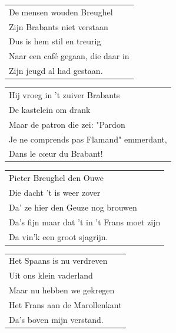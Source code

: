 \documentclass[a4paper, 14pt]{extarticle}
\begin{document}
\begin{flushleft}
\begin{tabularx}{0.8\textwidth} {
   >{\raggedright\arraybackslash}X}
\end{tabularx}
\end{flushleft}\begin{flushleft}
\begin{tabularx}{0.8\textwidth} {
   >{\raggedright\arraybackslash}X}
De mensen wouden Breughel\\
Zijn Brabants niet verstaan\\
Dus is hem stil en treurig\\
Naar een café gegaan, die daar in\\
Zijn jeugd al had gestaan.\\
\end{tabularx}
\end{flushleft}\begin{flushleft}
\begin{tabularx}{0.8\textwidth} {
   >{\raggedright\arraybackslash}X}
Hij vroeg in ’t zuiver Brabants\\
De kastelein om drank\\
Maar de patron die zei: "Pardon\\
Je ne comprends pas Flamand" emmerdant,\\
Dans le cœur du Brabant!\\
\end{tabularx}
\end{flushleft}\begin{flushleft}
\begin{tabularx}{0.8\textwidth} {
   >{\raggedright\arraybackslash}X}
Pieter Breughel den Ouwe\\
Die dacht ’t is weer zover\\
Da’ ze hier den Geuze nog brouwen\\
Da’s fijn maar dat ’t in ’t Frans moet zijn\\
Da vin’k een groot sjagrijn.\\
\end{tabularx}
\end{flushleft}\begin{flushleft}
\begin{tabularx}{0.8\textwidth} {
   >{\raggedright\arraybackslash}X}
Het Spaans is nu verdreven\\
Uit ons klein vaderland\\
Maar nu hebben we gekregen\\
Het Frans aan de Marollenkant\\
Da’s boven mijn verstand.\\
\end{tabularx}
\end{flushleft}\begin{flushleft}

\end{flushleft}
\end{document}
